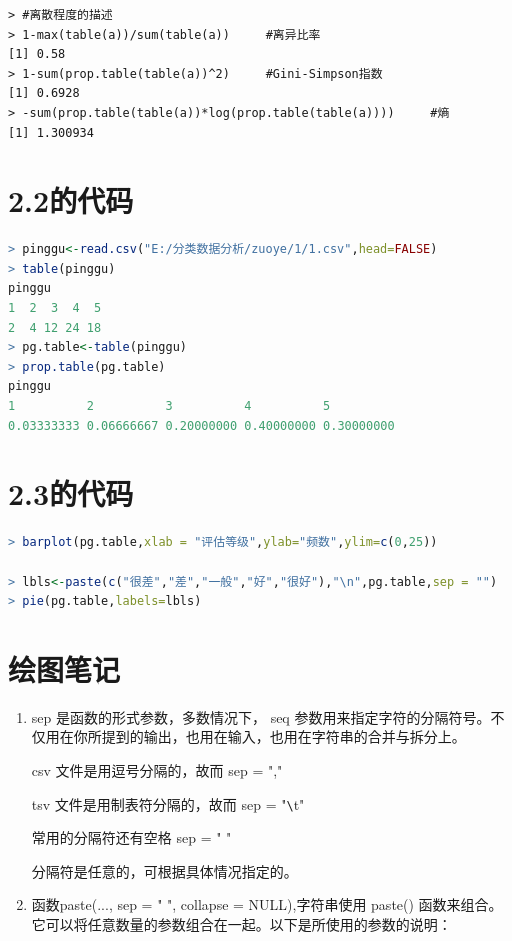 \documentclass[11pt,a4paper]{ctexart}
\begin{document}
\begin{appendices}
\begin{lstlisting}
> #离散程度的描述
> 1-max(table(a))/sum(table(a))     #离异比率
[1] 0.58
> 1-sum(prop.table(table(a))^2)     #Gini-Simpson指数
[1] 0.6928
> -sum(prop.table(table(a))*log(prop.table(table(a))))     #熵
[1] 1.300934
\end{lstlisting}

\section{2.2的代码}
\begin{lstlisting}[language=r]
> pinggu<-read.csv("E:/分类数据分析/zuoye/1/1.csv",head=FALSE)
> table(pinggu)
pinggu
1  2  3  4  5 
2  4 12 24 18 
> pg.table<-table(pinggu)
> prop.table(pg.table)
pinggu
1          2          3          4          5 
0.03333333 0.06666667 0.20000000 0.40000000 0.30000000 
\end{lstlisting}

\section{2.3的代码}
\begin{lstlisting}[language=r]
> barplot(pg.table,xlab = "评估等级",ylab="频数",ylim=c(0,25))

> lbls<-paste(c("很差","差","一般","好","很好"),"\n",pg.table,sep = "")
> pie(pg.table,labels=lbls)
\end{lstlisting}

\section{绘图笔记}
\begin{tcolorbox}[colback=pink!10!white,colframe=pink!100!black]
\begin{enumerate}
	\item sep 是函数的形式参数，多数情况下， seq 参数用来指定字符的分隔符号。不仅用在你所提到的输出，也用在输入，也用在字符串的合并与拆分上。
	
	csv 文件是用逗号分隔的，故而 sep = "," 
	
	tsv 文件是用制表符分隔的，故而 sep = "\verb|\|t"
	
	常用的分隔符还有空格 sep = " "
	
	分隔符是任意的，可根据具体情况指定的。
	
	\item 函数paste(..., sep = " ", collapse = NULL),字符串使用 paste() 函数来组合。它可以将任意数量的参数组合在一起。以下是所使用的参数的说明：
	

\end{enumerate}
\end{tcolorbox}
\end{appendices}
\end{document}
